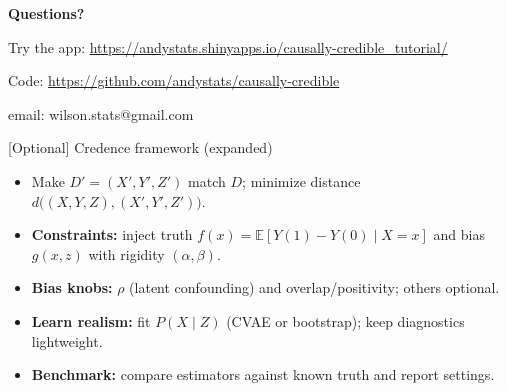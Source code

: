 \documentclass[aspectratio=169]{beamer}
\newcounter{savedframenumber}
\begin{document}
\begin{frame}{}
  \vfill
  \centering
  \Large
  \textbf{Questions?}

  \vspace{2em}

  \normalsize
  Try the app: \url{https://andystats.shinyapps.io/causally-credible_tutorial/}

  \vspace{1em}

  \small
  Code: \url{https://github.com/andystats/causally-credible}
  
    \vspace{1em}

  \small
  email: wilson.stats@gmail.com
  
  \vfill
\end{frame}

\setcounter{savedframenumber}{\value{framenumber}}
\appendix
\setcounter{framenumber}{\value{savedframenumber}}

\begin{frame}{[Optional] Credence framework (expanded)}
  \small
  \begin{itemize}
    \item  Make \(D'=(X',Y',Z')\) match \(D\); minimize distance \(d\big((X,Y,Z),(X',Y',Z')\big)\).
    \item \textbf{Constraints:} inject truth \(f(x)=\mathbb E[Y(1)-Y(0)\mid X=x]\) and bias \(g(x,z)\) with rigidity \((\alpha,\beta)\).
    \item \textbf{Bias knobs:} \(\rho\) (latent confounding) and overlap/positivity; others optional.
    \item \textbf{Learn realism:} fit \(P(X\mid Z)\) (CVAE or bootstrap); keep diagnostics lightweight.
    \item \textbf{Benchmark:} compare estimators against known truth and report settings.
  \end{itemize}
\end{frame}
\end{document}

